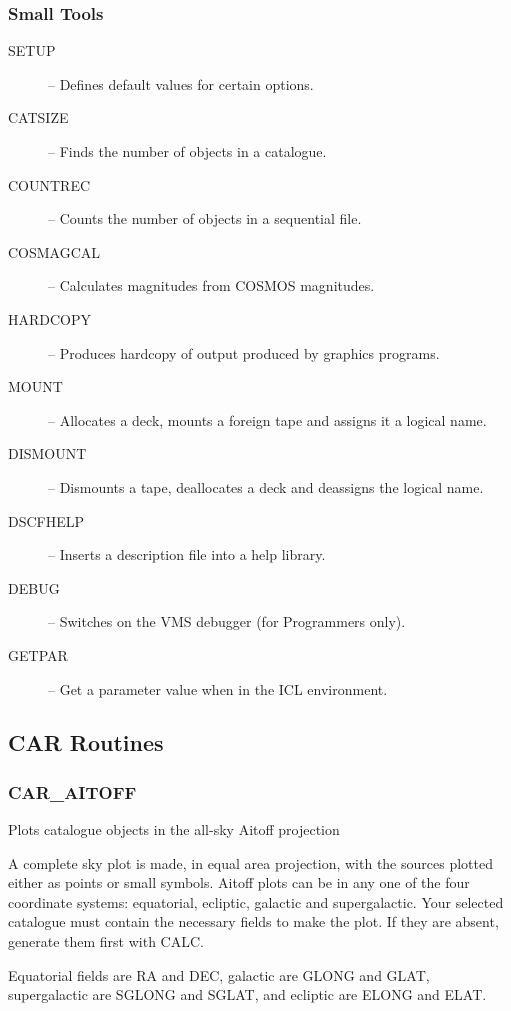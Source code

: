 \subsubsection {Small Tools}
\begin{description}
\begin{description}
\item [SETUP] -- Defines default values for certain options.
\item [CATSIZE] -- Finds the number of objects in a catalogue.
\item [COUNTREC] -- Counts the number of objects in a sequential file.
\item [COSMAGCAL] -- Calculates magnitudes from COSMOS magnitudes.
\item [HARDCOPY] -- Produces hardcopy of output produced by graphics programs.
\item [MOUNT] -- Allocates a deck, mounts a foreign tape and assigns it a 
logical name.
\item [DISMOUNT] -- Dismounts a tape, deallocates a deck and deassigns the
logical name.
\item [DSCFHELP] -- Inserts a description file into a help library.
\item [DEBUG] -- Switches on the VMS debugger (for Programmers only).
\item [GETPAR] -- Get a parameter value when in the ICL environment.
\end{description}
\end{description}


\subsection {CAR Routines}

\subsubsection{CAR\_AITOFF}
 
Plots catalogue objects in the all-sky Aitoff projection

A complete sky plot is made, in equal area projection, with the sources
plotted either as points or small symbols.
Aitoff plots can be in any one of the four coordinate systems:
equatorial, ecliptic, galactic and supergalactic.
Your selected catalogue must contain the necessary fields to make the plot.
If they are absent, generate them first with CALC.
 
Equatorial fields are RA and DEC, galactic are GLONG and GLAT,
supergalactic are SGLONG and SGLAT, and ecliptic are ELONG
and ELAT.

